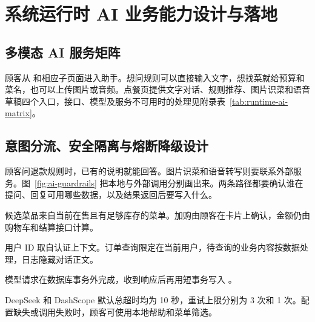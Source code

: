 \section{系统运行时 AI 业务能力设计与落地}

\subsection{多模态 AI 服务矩阵}

顾客从  和相应子页面进入助手。想问规则可以直接输入文字，想找菜就给预算和菜名，也可以上传图片或音频。点餐页提供文字对话、规则推荐、图片识菜和语音草稿四个入口，接口、模型及服务不可用时的处理见附录表~\ref{tab:runtime-ai-matrix}。

\subsection{意图分流、安全隔离与熔断降级设计}

顾客问退款规则时，已有的说明就能回答。图片识菜和语音转写则要联系外部服务。图~\ref{fig:ai-guardrails} 把本地与外部调用分别画出来。两条路径都要确认谁在提问、回复可用哪些数据，以及结果返回后要写入什么。

\begin{reportpoints}
  \item 候选菜品来自当前在售且有足够库存的菜单。加购由顾客在卡片上确认，金额仍由购物车和结算接口计算。
  \item 用户 ID 取自认证上下文。订单查询限定在当前用户，待查询的业务内容按数据处理，日志隐藏对话正文。
  \item 模型请求在数据库事务外完成，收到响应后再用短事务写入 。
  \item DeepSeek 和 DashScope 默认总超时均为 10 秒，重试上限分别为 3 次和 1 次。配置缺失或调用失败时，顾客可使用本地帮助和菜单筛选。
\end{reportpoints}


